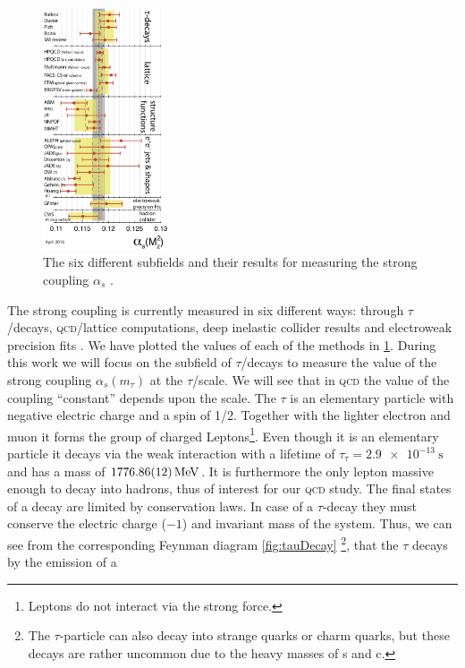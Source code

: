 \documentclass[../../index.tex]{subfiles}
\begin{document}
\begin{figure}
  \centering
  \vspace{-0.75cm}
  \includegraphics[width=0.33\textwidth]{./images/alphasDetermination.eps}
  \captionsetup{format=plain}
  \caption{The six different subfields and their results for measuring the
    strong coupling \(\alpha_s\) \cite{PDG2018}.}
  \label{fig:alphaSDetermination}
\end{figure}
The strong coupling is currently measured in six different ways: through
\(\tau\)\-/decays, \textsc{qcd}\-/lattice computations, deep inelastic collider
results and electroweak precision fits \cite{PDG2018}. We have plotted the
values of each of the methods in \cref{fig:alphaSDetermination}.
During this work we will focus on the subfield of $\tau$\-/decays to measure the
value of the strong coupling $\alpha_s(m_\tau)$ at the $\tau$\-/scale. We will
see that in \textsc{qcd} the value of the coupling ``constant'' depends upon the
scale. The $\tau$ is an elementary particle with negative electric charge and a
spin of 1/2. Together with the lighter electron and muon it forms the group of
charged Leptons\footnote{Leptons do not interact via the strong force.}. Even
though it is an elementary particle it decays via the weak interaction with a
lifetime of $\tau_\tau=\SI{2.9e-13}{\second}$ and has a mass of
$\SI{1776.86\pm0.12}{\mega\electronvolt}$\cite{PDG2018}. It is furthermore the
only lepton massive enough to decay into hadrons, thus of interest for our
\textsc{qcd} study. The final states of a decay are limited by conservation
laws. In case of a $\tau$-decay they must conserve the electric charge ($-1$)
and invariant mass of the system. Thus, we can see from the corresponding
Feynman diagram \cref{fig:tauDecay} \footnote{The $\tau$-particle can also decay
  into strange quarks or charm quarks, but these decays are rather uncommon due
  to the heavy masses of s and c.}, that the $\tau$ decays by the emission of a
\end{document}
